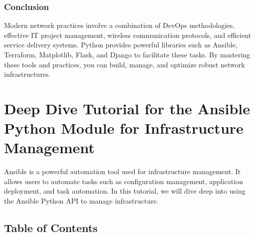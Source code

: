 \documentclass[
  letterpaper,
  DIV=11,
  numbers=noendperiod]{scrreprt}
\begin{document}
\subsection{Conclusion}\label{conclusion-50}

Modern network practices involve a combination of DevOps methodologies,
effective IT project management, wireless communication protocols, and
efficient service delivery systems. Python provides powerful libraries
such as Ansible, Terraform, Matplotlib, Flask, and Django to facilitate
these tasks. By mastering these tools and practices, you can build,
manage, and optimize robust network infrastructures.


\chapter{Deep Dive Tutorial for the Ansible Python Module for
Infrastructure
Management}\label{deep-dive-tutorial-for-the-ansible-python-module-for-infrastructure-management}

Ansible is a powerful automation tool used for infrastructure
management. It allows users to automate tasks such as configuration
management, application deployment, and task automation. In this
tutorial, we will dive deep into using the Ansible Python API to manage
infrastructure.

\section{Table of Contents}\label{table-of-contents-21}
\end{document}
